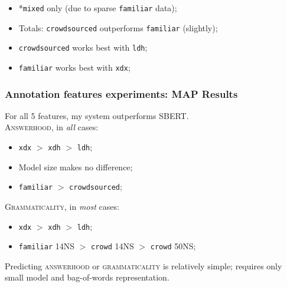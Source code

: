 \documentclass[xcolor={dvipsnames}]{beamer}
\newcommand{\feat}[1]{\textsc{#1}}
\newcommand{\param}[1]{\texttt{#1}}
\begin{document}
\begin{frame}
\begin{table}[htb!]
\begin{center}
\end{center}
\end{table}

\begin{itemize}
\item *\param{mixed} only (due to sparse \param{familiar} data);
\item Totals: \param{crowdsourced} outperforms \param{familiar} (slightly);
\item \param{crowdsourced} works best with \param{ldh};
\item \param{familiar} works best with \param{xdx};
\end{itemize}

\end{frame}

\begin{frame}
\frametitle{Annotation features experiments: MAP Results}
\vspace{-1em}

\pause
For all 5 features, my system outperforms SBERT. \\

\vspace{1em}
\pause
\feat{Answerhood}, in \textit{all} cases:
\begin{itemize}
\pause
\item \param{xdx} $>$ \param{xdh} $>$ \param{ldh};
\pause
\item Model size makes no difference;
\pause
\item \param{familiar} $>$ \param{crowdsourced};
\end{itemize}

\vspace{1em}

\pause
\feat{Grammaticality}, in \textit{most} cases:
\begin{itemize}
\pause
\item \param{xdx} $>$ \param{xdh} $>$ \param{ldh};
\pause
\item \param{familiar} 14NS $>$ \param{crowd} 14NS $>$ \param{crowd} 50NS;
\end{itemize}

\vspace{1em}

\pause
Predicting \feat{answerhood} or \feat{grammaticality} is relatively simple; requires only small model and bag-of-words representation.

\end{frame}
\end{document}
